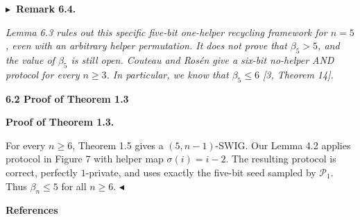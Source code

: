 

\par\medskip\noindent\textbf{
$\blacktriangleright$ Remark 6.4.
}\par



\emph{Lemma 6.3 rules out this specific five-bit one-helper recycling framework for $n=5$, even with an arbitrary helper permutation. It does not prove that $\beta_{5}>5$, and the value of $\beta_{5}$ is still open. Couteau and Rosén give a six-bit no-helper AND protocol for every $n\geq 3$. In particular, we know that $\beta_{5}\leq 6$ [3, Theorem 14].}\par








\par\medskip\noindent\textbf{
6.2 Proof of Theorem 1.3
}\par




\par\medskip\noindent\textbf{Proof of Theorem 1.3.}\par




For every $n\geq 6$, Theorem 1.5 gives a $(5,n-1)$-SWIG. Our Lemma 4.2 applies protocol in Figure 7 with helper map $\sigma(i)=i-2$. The resulting protocol is correct, perfectly $1$-private, and uses exactly the five-bit seed sampled by $\mathcal{P}_{1}$. Thus $\beta_{n}\leq 5$ for all $n\geq 6$.
$\blacktriangleleft$\par







\par\medskip\noindent\textbf{References}\par




